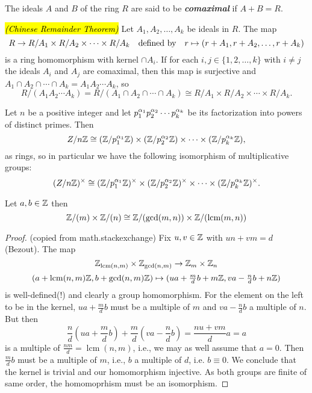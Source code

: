 \nl

\begin{defn}
The ideals $A$ and $B$ of the ring $R$ are said to be \textbf{\textit{comaximal}} if $A + B = R$.
\end{defn}

\nl

\begin{thm}\hl{\textit{(Chinese Remainder Theorem)}} Let $A_1,A_2,\ldots,A_k$ be ideals in $R$. The map
\[R\rightarrow R/A_1\times R/A_2\times\cdots\times R/A_k\quad\text{defined by}\quad r\mapsto(r+A_1,r+A_2,\ldots,r+A_k)\]
is a ring homomorphism with kernel $\cap A_i$. If for each $i,j\in\{1,2,\ldots,k\}$ with $i\neq j$ the ideals $A_i$ and $A_j$ are comaximal, then this map is surjective and $A_1\cap A_2\cap\cdots\cap A_k = A_1A_2\cdots A_k$, so
\[R/(A_1A_2\cdots A_k) = R/(A_1\cap A_2\cap\cdots\cap A_k) \cong R/A_1\times R/A_2\times\cdots\times R/A_k.\]
\end{thm}

\nl

\begin{cor}
Let $n$ be a positive integer and let $p_1^{\alpha_1}p_2^{\alpha_2}\cdots p_k^{\alpha_k}$ be its factorization into powers of distinct primes. Then
\[Z/n\mathbb{Z} \cong (\mathbb{Z}/p_1^{\alpha_1}\mathbb{Z})\times(\mathbb{Z}/p_2^{\alpha_2}\mathbb{Z})\times\cdots\times (\mathbb{Z}/p_k^{\alpha_k}\mathbb{Z}),\]
as rings, so in particular we have the following isomorphism of multiplicative groups:
\[(Z/n\mathbb{Z})^\times \cong (\mathbb{Z}/p_1^{\alpha_1}\mathbb{Z})^\times\times(\mathbb{Z}/p_2^{\alpha_2}\mathbb{Z})^\times\times\cdots\times (\mathbb{Z}/p_k^{\alpha_k}\mathbb{Z})^\times.\]
\end{cor}

\nl

\begin{cor}
Let $a,b\in \mathbb{Z}$ then
\[\mathbb{Z}/(m)\times \mathbb{Z}/(n) \cong \mathbb{Z}/(\gcd(m,n))\times \mathbb{Z}/(\text{lcm}(m,n))\]
\end{cor}

\begin{proof}(copied from math.stackexchange)
Fix $u,v\in\Bbb Z$ with $un+vm=d$ (Bezout). 
The map $$\Bbb Z_{\operatorname{lcm}(n,m)}\times\Bbb Z_{\gcd(n,m)} \to\Bbb Z_m\times\Bbb Z_n$$
$$ (a+\operatorname{lcm}(n,m)\Bbb Z,b+\gcd(n,m)\Bbb Z)\mapsto(ua+\tfrac mdb+m\Bbb Z,va-\tfrac ndb+n\Bbb Z)$$
is well-defined(!) and clearly a group homomorphism.
For the element on the left to be in the kernel, 
$ua+\tfrac mdb$ must be a multiple of $m$ and $va-\tfrac ndb$ a multiple of $n$.
But then
$$\frac nd\left(ua+\frac mdb\right)+\frac md\left(va-\frac ndb\right) 
=\frac{nu+vm}{d}a=a$$ 
is a multiple of $\frac{nm}d=\operatorname{lcm}(n,m)$, i.e., we may as well assume that $a=0$. Then $\frac mdb$ must be a multiple of $m$, i.e., $b$ a multiple of $d$, i.e. $b\equiv 0$. We conclude that the kernel is trivial and our homomorphism injective. As both groups are finite of same order, the homomoprhism must be an isomorphism.
\end{proof}
